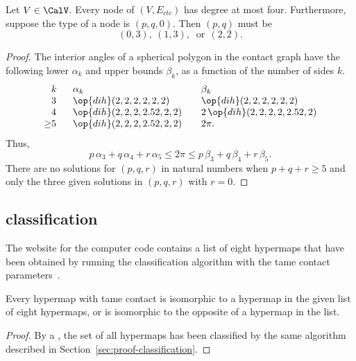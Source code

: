 \begin{lemma}[]\label{lemma:no-5} 
  Let $V\in \CalV$.  Every node of $(V,E_{ctc})$ has degree at most
  four.  Furthermore, suppose the type of a node is $(p,q,0)$.  Then
  $(p,q)$ must be
\[
(0,3),~(1,3),~\text{ or}~~(2,2).
\]
\end{lemma}

\begin{proof} The interior angles of a spherical polygon in the
  contact graph have the following lower $\alpha_k$ and upper bounds
  $\beta_k$, as a function of the number of sides $k$.
\begin{equation}
\begin{array}{lllll}
  \phantom{\ge}k~~&\alpha_k & \beta_k\\
  \phantom{\ge}3~~&\op{dih}(2,2,2,2,2,2)  &\op{dih}(2,2,2,2,2,2)\\
  \phantom{\ge}4~~&\op{dih}(2,2,2,2.52,2,2) &2\,\op{dih}(2,2,2,2,2.52,2)\\
  {\ge}5~~& \op{dih}(2,2,2,2.52,2,2) ~~~& 2\pi.
\end{array}
\end{equation}
Thus,
\[
  p\,\alpha_3 + q\,\alpha_4 +r\, \alpha_5 
\le 2\pi \le p\,\beta_3 + q\,\beta_4 + r \,\beta_5.
\]
There are no solutions for
$(p,q,r)$ in natural numbers when $p+q+r\ge 5$ and
 only the three given solutions in $(p,q,r)$ with $r=0$.
\end{proof}



\subsection{classification}

The website for the computer code  contains a list of eight hypermaps
that have been obtained by running the classification algorithm with
the tame contact parameters~\cite{website:FlyspeckProject}.

\begin{lemma}\cutrate{}
  \label{lemma:contact-classification} Every hypermap with tame
  contact is isomorphic to a hypermap in the given list of eight
  hypermaps, or is isomorphic to the opposite of a hypermap in the
  list.  %
\end{lemma}

\begin{proof}
  By a , %
 the set of all hypermaps has been classified by the same
  algorithm described in Section~\ref{sec:proof-classification}.
\end{proof}



